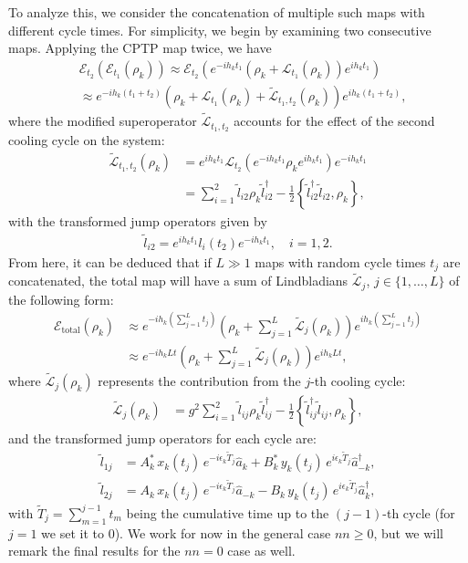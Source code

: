 To analyze this, we consider the concatenation of multiple such maps with different cycle times. For simplicity, we begin by examining two consecutive maps. Applying the CPTP map twice, we have
\begin{align}
     &\mathcal{E}_{t_2}( \mathcal{E}_{t_1}(\rho_k) ) \approx \mathcal{E}_{t_2} \left( e^{-i h_k t_1}\left( \rho_k + \mathcal{L}_{t_1}(\rho_k) \right)e^{i h_k t_1} \right) \nonumber\\
     &\approx e^{-i h_k (t_1 + t_2)} \left( \rho_k + \mathcal{L}_{t_1}(\rho_k) + \tilde{\mathcal{L}}_{t_1, t_2}(\rho_k) \right) e^{i h_k (t_1 + t_2)},
\end{align}
where the modified superoperator $\tilde{\mathcal{L}}_{t_1, t_2}$ accounts for the effect of the second cooling cycle on the system:
\begin{align}
    \tilde{\mathcal{L}}_{t_1, t_2}(\rho_k) &= e^{i h_k t_1} \mathcal{L}_{t_2} \left( e^{-ih_k t_1} \rho_k e^{i h_k t_1} \right) e^{-i h_k t_1} \nonumber\\
                                           &= \sum_{i=1}^2 \tilde{l}_{i2} \rho_k \tilde{l}_{i2}^\dag - \frac{1}{2} \left\{ \tilde{l}_{i2}^\dag \tilde{l}_{i2}, \rho_k \right\},
\end{align}
with the transformed jump operators given by
\begin{align}
    \tilde{l}_{i2} = e^{i h_k t_1} l_{i}(t_2) e^{-i h_k t_1}, \quad i = 1,2.
\end{align}
From here, it can be deduced that if $L\gg 1$ maps with random cycle times $t_j$ are concatenated, the total map will have a sum of Lindbladians $\tilde{\mathcal{L}}_{j}$, $j\in\{1,\ldots,L\}$ of the following form:
\begin{align}
    \mathcal{E}_{\text{total}}(\rho_k) &\approx e^{-i h_k (\sum_{j=1}^L t_j)} \left( \rho_k + \sum_{j=1}^L \tilde{\mathcal{L}}_{j}(\rho_k) \right) e^{i h_k (\sum_{j=1}^L t_j)}\nonumber\\
                                       &\approx e^{-i h_k L t} \left( \rho_k + \sum_{j=1}^L \tilde{\mathcal{L}}_j(\rho_k) \right) e^{i h_k L t},
\end{align}
where $\tilde{\mathcal{L}}_j(\rho_k)$ represents the contribution from the $j$-th cooling cycle:
\begin{align}
    \tilde{\mathcal{L}}_{j}(\rho_k) &= g^2\sum_{i=1}^2 \tilde{l}_{i j} \rho_k \tilde{l}_{i j}^\dag - \frac{1}{2} \left\{ \tilde{l}_{i j}^\dag \tilde{l}_{i j}, \rho_k \right\},
\end{align}
and the transformed jump operators for each cycle are:
\begin{align}
    \tilde{l}_{1j} &= A^*_k\, x_k(t_j)\, e^{-i \epsilon_k \tilde{T}_j} \hat{a}_k + B^*_k\, y_k(t_j)\, e^{i \epsilon_k \tilde{T}_j} \hat{a}_{-k}^\dag,\\
    \tilde{l}_{2j} &= A_k\, x_k(t_j)\, e^{-i \epsilon_k \tilde{T}_j} \hat{a}_{-k} - B_k\, y_k(t_j)\, e^{i \epsilon_k \tilde{T}_j} \hat{a}_k^\dag,
\end{align}
with $\tilde{T}_j = \sum_{m=1}^{j-1} t_m$ being the cumulative time up to the $(j-1)$-th cycle (for $j=1$ we set it to $0$). We work for now in the general case $nn\geq0$, but we will remark the final results for the $nn=0$ case as well.

